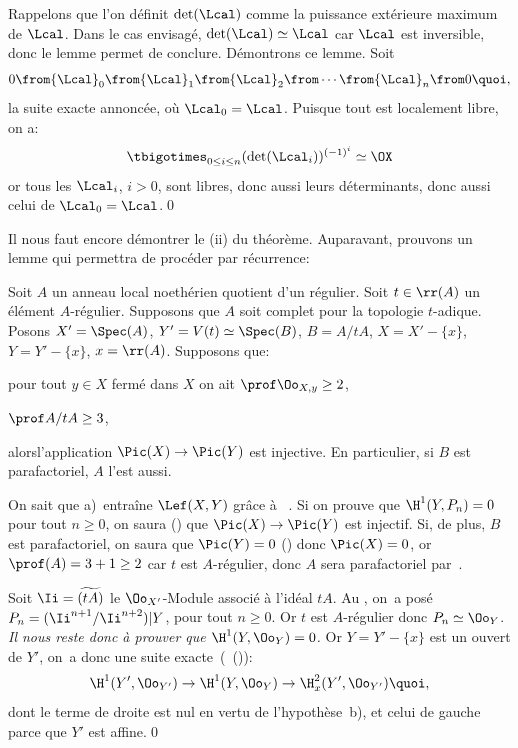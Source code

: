 Rappelons que l'on d\'efinit $\det({\Lcal})$ comme la puissance ext\'erieure maximum de ${\Lcal}$. Dans le cas envisag\'e, $\det({\Lcal}) \simeq{\Lcal}$ car ${\Lcal}$ est inversible, donc le lemme permet de conclure. D\'emontrons ce lemme. Soit
\[
0\from {\Lcal}_0\from {\Lcal}_1\from {\Lcal}_2\from\cdots\from{\Lcal}_n\from 0{\quoi},
\]
la suite exacte annonc\'ee, o\`u ${\Lcal}_0={\Lcal}$. Puisque tout est localement libre, on a:
\[
\tbigotimes_{0\leq i\leq n}(\det({\Lcal}_i))^{(-1)^i} \simeq \OX
\]
or tous les ${\Lcal}_i$, $i>0$, sont libres, donc aussi leurs d\'eterminants, donc aussi celui de ${\Lcal}_0 = {\Lcal}$.\qed

\medskip
Il nous faut encore d\'emontrer le (ii) du th\'eor\`eme. Auparavant, prouvons un lemme qui permettra de proc\'eder par r\'ecurrence:

\begin{lemme} \label{XI.3.16}
Soit $A$ un anneau local noeth\'erien quotient d'un r\'egulier. Soit $t\in\rr(A)$ un \'el\'ement $A$-r\'egulier. Supposons que $A$ soit complet pour la topologie $t$-adique. Posons $X'=\Spec(A)$, $Y'=V(t)\simeq \Spec(B)$, $B=A/tA$, $X=X'-\{x\}$, $Y=Y'-\{x\}$, $x=\rr(A)$. Supposons que:
\begin{enumeratea}
\item
pour tout $y\in X$ ferm\'e dans $X$ on ait $\prof\Oo_{X, y}\geq 2$,
\item
$\prof A/tA\geq 3$,
\end{enumeratea}
\noindent
alors\pageoriginale l'application $\Pic(X)\to\Pic(Y)$ est injective. En particulier, si $B$ est parafactoriel, $A$ l'est aussi.
\end{lemme}

On sait que a)~entra\^ine $\Lef(X, Y)$ gr\^ace \`a ~. Si on prouve que $\H^1(Y, P_n)=0$ pour tout $n\geq 0$, on saura \ignorespaces () que $\Pic(X)\to\Pic(Y)$ est injectif. Si, de plus, $B$ est parafactoriel, on saura que $\Pic(Y)=0$ () donc $\Pic(X)=0$, or $\prof(A)=3+1\geq 2$ car $t$ est $A$-r\'egulier, donc $A$ sera parafactoriel par~.

Soit $\Ii=\widetilde{(tA)}$ le $\Oo_{X'}$-Module associ\'e \`a l'id\'eal $tA$. Au \numero {}, on~a pos\'e $P_n = (\Ii^{n+1}/\Ii^{n+2}){|Y}$, pour tout $n\geq 0$. Or $t$ est $A$-r\'egulier donc $P_n\simeq \Oo_Y$. \emph{Il nous reste donc \`a prouver que $\H^1(Y, \Oo_Y)=0$.} Or $Y = Y'-\{x\}$ est un ouvert de $Y'$, on~a donc une suite exacte~(~()):
\[
\H^1(Y', \Oo_{Y'})\to\H^1(Y, \Oo_{Y})\to\H^2_x(Y', \Oo_{Y'}){\quoi},
\]
dont le terme de droite est nul en vertu de l'hypoth\`ese~b), et celui de gauche parce que $Y'$ est affine.\qed

